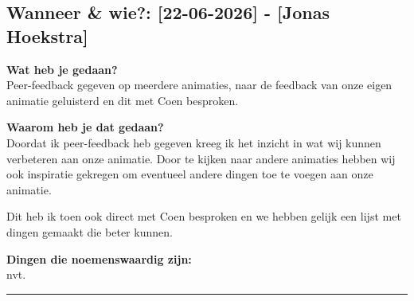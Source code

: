
\subsection*{Wanneer \& wie?: [22-06-2026] - [Jonas Hoekstra]}

\textbf{Wat heb je gedaan?}\\
Peer-feedback gegeven op meerdere animaties, naar de feedback van onze eigen animatie geluisterd en dit met Coen besproken.
\vspace{0.3cm} 

\noindent \textbf{Waarom heb je dat gedaan?}\\
Doordat ik peer-feedback heb gegeven kreeg ik het inzicht in wat wij kunnen verbeteren aan onze animatie. Door te kijken naar andere animaties hebben wij ook inspiratie gekregen om eventueel andere dingen toe te voegen aan onze animatie. 

Dit heb ik toen ook direct met Coen besproken en we hebben gelijk een lijst met dingen gemaakt die beter kunnen.

\noindent \textbf{Dingen die noemenswaardig zijn:}\\
nvt.


\vspace{0.5cm}
\hrule 
\vspace{0.5cm}
